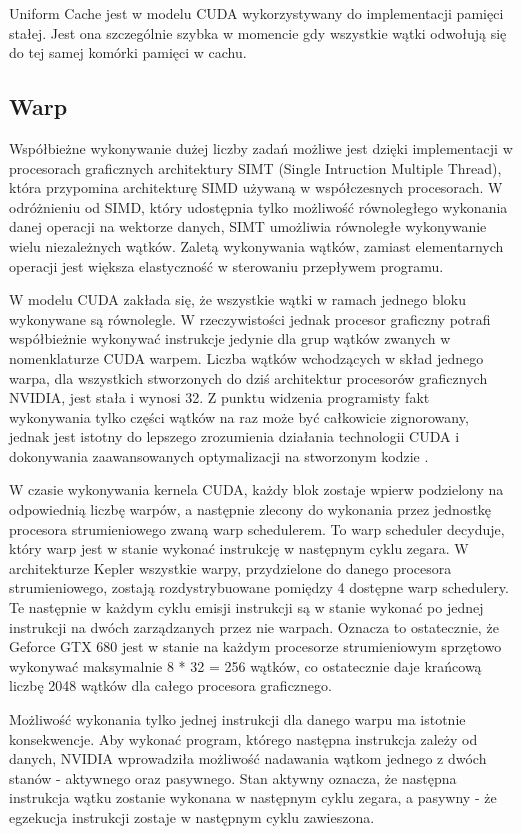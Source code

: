 Uniform Cache jest w modelu CUDA wykorzystywany do implementacji pamięci
stałej. Jest ona szczególnie szybka w momencie gdy wszystkie wątki odwołują się
do tej samej komórki pamięci w cachu.

\subsection{Warp}

Współbieżne wykonywanie dużej liczby zadań możliwe jest dzięki implementacji
w procesorach graficznych architektury SIMT (Single Intruction Multiple Thread), która
przypomina architekturę SIMD używaną w współczesnych procesorach. W
odróżnieniu od SIMD, który udostępnia tylko możliwość równoległego wykonania danej
operacji na wektorze danych, SIMT umożliwia równoległe wykonywanie wielu
niezależnych wątków. Zaletą wykonywania wątków, zamiast elementarnych operacji jest większa
elastyczność w sterowaniu przepływem programu.

W modelu CUDA zakłada się, że wszystkie wątki w ramach jednego bloku wykonywane
są równolegle. W rzeczywistości jednak procesor graficzny potrafi współbieżnie
wykonywać instrukcje jedynie dla grup wątków zwanych w nomenklaturze CUDA
warpem.  Liczba wątków wchodzących w skład jednego warpa, dla wszystkich
stworzonych do dziś architektur procesorów graficznych NVIDIA, jest stała i
wynosi 32. Z punktu widzenia programisty fakt wykonywania tylko części wątków na
raz może być całkowicie zignorowany, jednak jest istotny do lepszego zrozumienia
działania technologii CUDA i dokonywania zaawansowanych optymalizacji na stworzonym
kodzie \cite{kepler}.

W czasie wykonywania kernela CUDA, każdy blok zostaje wpierw podzielony na
odpowiednią liczbę warpów, a następnie zlecony do wykonania przez jednostkę
procesora strumieniowego zwaną warp schedulerem. To warp scheduler decyduje, który warp
jest w stanie wykonać instrukcję w następnym cyklu zegara. W architekturze
Kepler wszystkie warpy, przydzielone do danego procesora strumieniowego,
zostają rozdystrybuowane pomiędzy 4 dostępne warp schedulery. Te następnie w
każdym cyklu emisji instrukcji są w stanie wykonać po jednej instrukcji na
dwóch zarządzanych przez nie warpach. Oznacza to ostatecznie, że Geforce GTX 680
jest w stanie na każdym procesorze strumieniowym sprzętowo wykonywać maksymalnie 8 * 32 =
256 wątków, co ostatecznie daje krańcową liczbę 2048 wątków dla całego procesora
graficznego.

Możliwość wykonania tylko jednej instrukcji dla danego warpu ma istotnie
konsekwencje. Aby wykonać program, którego następna instrukcja
zależy od danych, NVIDIA wprowadziła możliwość nadawania wątkom jednego z dwóch stanów -
aktywnego oraz pasywnego. Stan aktywny oznacza, że następna instrukcja wątku
zostanie wykonana w następnym cyklu zegara, a pasywny - że egzekucja instrukcji
zostaje w następnym cyklu zawieszona.


